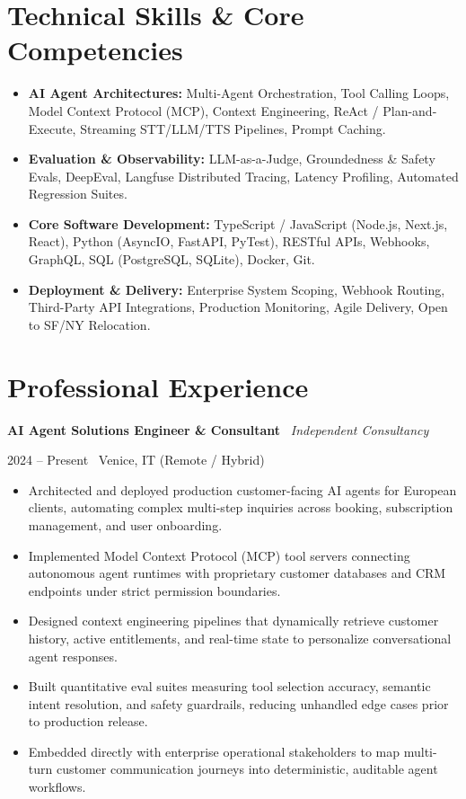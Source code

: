 \documentclass[a4paper,10pt]{article}
\newcommand{\role}[4]{%
  \vspace{2pt}\noindent
  \begin{minipage}[t]{0.70\textwidth}\raggedright\textbf{#1} \textbullet\ \textit{#3}\end{minipage}%
  \hfill
  \begin{minipage}[t]{0.28\textwidth}\raggedleft\footnotesize\color{gray}#2 \textbullet\ #4\end{minipage}%
  \vspace{1pt}%
}
\begin{document}
\section{Technical Skills \& Core Competencies}
\begin{itemize}[leftmargin=1.2em, itemsep=2pt]
  \item \textbf{AI Agent Architectures:} Multi-Agent Orchestration, Tool Calling Loops, Model Context Protocol (MCP), Context Engineering, ReAct / Plan-and-Execute, Streaming STT/LLM/TTS Pipelines, Prompt Caching.
  \item \textbf{Evaluation \& Observability:} LLM-as-a-Judge, Groundedness \& Safety Evals, DeepEval, Langfuse Distributed Tracing, Latency Profiling, Automated Regression Suites.
  \item \textbf{Core Software Development:} TypeScript / JavaScript (Node.js, Next.js, React), Python (AsyncIO, FastAPI, PyTest), RESTful APIs, Webhooks, GraphQL, SQL (PostgreSQL, SQLite), Docker, Git.
  \item \textbf{Deployment \& Delivery:} Enterprise System Scoping, Webhook Routing, Third-Party API Integrations, Production Monitoring, Agile Delivery, Open to SF/NY Relocation.
\end{itemize}

\section{Professional Experience}

\role{AI Agent Solutions Engineer \& Consultant}{2024 -- Present}{Independent Consultancy}{Venice, IT (Remote / Hybrid)}
\begin{itemize}
  \item Architected and deployed production customer-facing AI agents for European clients, automating complex multi-step inquiries across booking, subscription management, and user onboarding.
  \item Implemented Model Context Protocol (MCP) tool servers connecting autonomous agent runtimes with proprietary customer databases and CRM endpoints under strict permission boundaries.
  \item Designed context engineering pipelines that dynamically retrieve customer history, active entitlements, and real-time state to personalize conversational agent responses.
  \item Built quantitative eval suites measuring tool selection accuracy, semantic intent resolution, and safety guardrails, reducing unhandled edge cases prior to production release.
  \item Embedded directly with enterprise operational stakeholders to map multi-turn customer communication journeys into deterministic, auditable agent workflows.
\end{itemize}
\end{document}
